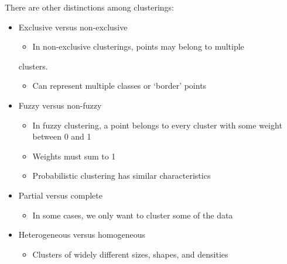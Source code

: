 There are other distinctions among clusterings:
\begin{itemize}
	\item Exclusive versus non-exclusive
	      \begin{itemize}
		      \item In non-exclusive clusterings, points may belong to multiple
	      \end{itemize}
	      clusters.
	      \begin{itemize}
		      \item Can represent multiple classes or ‘border’ points
	      \end{itemize}
	\item Fuzzy versus non-fuzzy
	      \begin{itemize}
		      \item In fuzzy clustering, a point belongs to every cluster with some
		            weight between 0 and 1
		      \item Weights must sum to 1
		      \item Probabilistic clustering has similar characteristics
	      \end{itemize}
	\item Partial versus complete
	      \begin{itemize}
		      \item In some cases, we only want to cluster some of the data
	      \end{itemize}
	\item Heterogeneous versus homogeneous
	      \begin{itemize}
		      \item Clusters of widely different sizes, shapes, and densities
	      \end{itemize}
\end{itemize}

